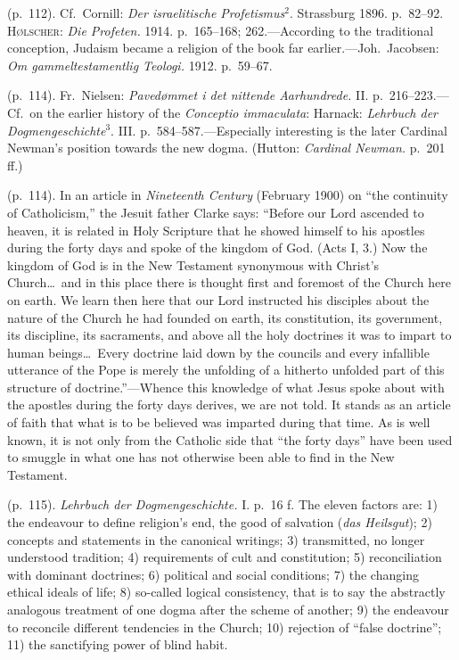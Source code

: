\documentclass[12pt,a4paper]{book}
\newcommand{\opage}[1]{\marginnote{\footnotesize\textit{[#1]}}}
\begin{document}
 (p.~112). Cf.\ Cornill: \emph{Der israelitische Profetismus}$^2$. Strassburg 1896. p.~82--92.
\textsc{Hølscher}: \emph{Die Profeten.} 1914. p.~165--168; 262.---According to the traditional
conception, Judaism became a religion of the book far earlier.---Joh.\ Jacobsen: \emph{Om
gammeltestamentlig Teologi.} 1912. p.~59--67.

 (p.~114). Fr.\ Nielsen: \emph{Pavedømmet i det nittende Aarhundrede.} II. p.~216--223.---Cf.\ on the
earlier history of the \emph{Conceptio immaculata}: Harnack: \emph{Lehrbuch der
Dogmengeschichte}$^3$. III. p.~584--587.---Especially interesting is the later Cardinal Newman's
position towards the new dogma. (Hutton: \emph{Cardinal Newman.} p.~201 ff.)

 (p.~114). In an article in \emph{Nineteenth Century} (February 1900) on ``the continuity of
Catholicism,'' the Jesuit father Clarke says: ``Before our Lord ascended to heaven, it is related in
Holy Scripture that he showed himself to his apostles during the forty days and spoke of the kingdom
of God. (Acts I, 3.) Now the kingdom of God is in the New Testament synonymous with Christ's
Church\ldots\ and in this place there is thought first and foremost of the Church here on earth. We
learn then here that our Lord instructed his disciples about the nature of the Church he had founded
on earth, its constitution, its government, its discipline, its sacraments, and above all the holy
doctrines it was to impart to human beings\ldots\ Every doctrine laid down by the councils and every
infallible utterance of the Pope is merely the unfolding of a hitherto 
\opage{251}unfolded part of this
structure of doctrine.''---Whence this knowledge of what Jesus spoke about with the apostles during
the forty days derives, we are not told. It stands as an article of faith that what is to be believed
was imparted during that time. As is well known, it is not only from the Catholic side that ``the
forty days'' have been used to smuggle in what one has not otherwise been able to find in the New
Testament.

 (p.~115). \emph{Lehrbuch der Dogmengeschichte.} I. p.~16 f. The eleven factors are: 1) the
endeavour to define religion's end, the good of salvation (\emph{das Heilsgut}); 2) concepts and
statements in the canonical writings; 3) transmitted, no longer understood tradition; 4)
requirements of cult and constitution; 5) reconciliation with dominant doctrines; 6) political and
social conditions; 7) the changing ethical ideals of life; 8) so-called logical consistency, that is
to say the abstractly analogous treatment of one dogma after the scheme of another; 9) the endeavour
to reconcile different tendencies in the Church; 10) rejection of ``false doctrine''; 11) the
sanctifying power of blind habit.
\end{document}
